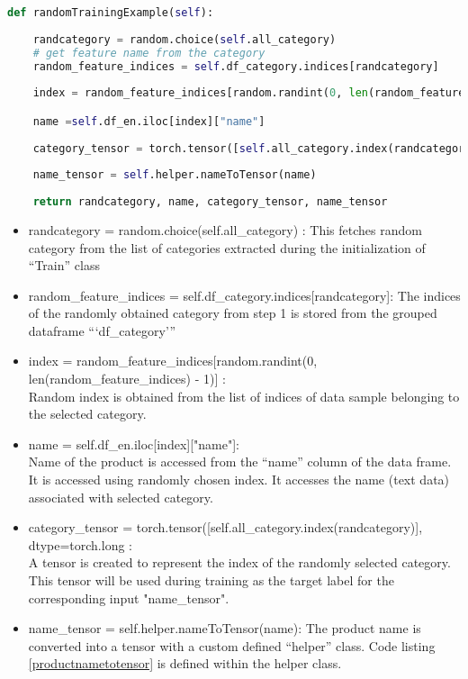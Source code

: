 \begin{lstlisting}[language=Python,caption={Train class constructor},label={code:rtcc}]
def randomTrainingExample(self):
    
    randcategory = random.choice(self.all_category)
    # get feature name from the category
    random_feature_indices = self.df_category.indices[randcategory]
    
    index = random_feature_indices[random.randint(0, len(random_feature_indices) - 1)]

    name =self.df_en.iloc[index]["name"]
    
    category_tensor = torch.tensor([self.all_category.index(randcategory)], dtype=torch.long)
    
    name_tensor = self.helper.nameToTensor(name)
    
    return randcategory, name, category_tensor, name_tensor
\end{lstlisting}

\begin{itemize}
    \item randcategory = random.choice(self.all\_category) : This fetches random category from the list of categories extracted during the initialization of ``Train'' class  
    \item random\_feature\_indices = self.df\_category.indices[randcategory]: The indices of the randomly obtained category from step 1 is stored from the grouped dataframe ```df\_category'''
    \item index = random\_feature\_indices[random.randint(0, len(random\_feature\_indices) - 1)] :\\ Random index is obtained from the list of indices of data sample belonging to the selected category.
    \item name = self.df\_en.iloc[index]["name"]:\\ Name of the product is accessed from the ``name'' column of the data frame. It is accessed using randomly chosen index. It accesses the name (text data) associated with selected category.
    \item category\_tensor = torch.tensor([self.all\_category.index(randcategory)], dtype=torch.long : \\ A tensor is created to represent the index of the randomly selected category. This tensor will be used during training as the target label for the corresponding input "name\_tensor".
    \item name\_tensor = self.helper.nameToTensor(name): The product name is converted into a tensor with a custom defined ``helper'' class. Code listing \ref{productnametotensor} is defined within the helper class.
    

\end{itemize}

